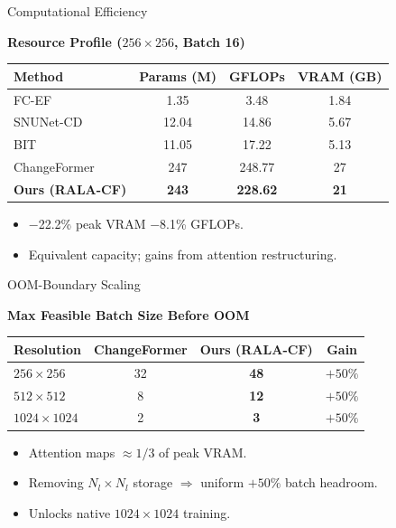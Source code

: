 \documentclass[aspectratio=169]{beamer}
\begin{document}
\begin{frame}{Computational Efficiency}

\centering
\textbf{\color{utecblue}Resource Profile ($256{\times}256$, Batch 16)}
\vskip 0.3cm

\renewcommand{\arraystretch}{1.25}
\footnotesize
\begin{tabular}{|l|c|c|c|}
\hline
\textbf{Method} & \textbf{Params (M)} & \textbf{GFLOPs} & \textbf{VRAM (GB)} \\
\hline\hline
FC-EF        &  1.35 &   3.48 &  1.84 \\ \hline
SNUNet-CD    & 12.04 &  14.86 &  5.67 \\ \hline
BIT          & 11.05 &  17.22 &  5.13 \\ \hline
ChangeFormer & 247   & 248.77 & 27 \\ \hline
\rowcolor{pastelorange}
\textbf{Ours (RALA-CF)} & \textbf{243} & \textbf{228.62} & \textbf{21} \\ \hline
\end{tabular}

\vskip 0.5cm
\footnotesize
\begin{itemize}
  \item $-$22.2\% peak VRAM \quad $-$8.1\% GFLOPs.
  \item Equivalent capacity; gains from attention restructuring.
\end{itemize}

\end{frame}

\begin{frame}{OOM-Boundary Scaling}

\centering
\textbf{\color{utecblue}Max Feasible Batch Size Before OOM}
\vskip 0.3cm

\renewcommand{\arraystretch}{1.25}
\footnotesize
\begin{tabular}{|l|c|c|c|}
\hline
\textbf{Resolution} & \textbf{ChangeFormer} & \textbf{Ours (RALA-CF)} & \textbf{Gain} \\
\hline\hline
$256{\times}256$    & 32 & \textbf{48} & $+50\%$ \\ \hline
$512{\times}512$    &  8 & \textbf{12} & $+50\%$ \\ \hline
$1024{\times}1024$  &  2 & \textbf{3}  & $+50\%$ \\ \hline
\end{tabular}

\vskip 0.5cm
\footnotesize
\begin{itemize}
  \item Attention maps $\approx 1/3$ of peak VRAM.
  \item Removing $N_l{\times}N_l$ storage $\Rightarrow$ uniform $+50\%$ batch headroom.
  \item Unlocks native $1024{\times}1024$ training.
\end{itemize}

\end{frame}
\end{document}
